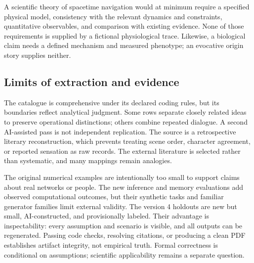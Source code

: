 A scientific theory of spacetime navigation would at minimum require a specified physical model, consistency with the relevant dynamics and constraints, quantitative observables, and comparison with existing evidence. None of those requirements is supplied by a fictional physiological trace. Likewise, a biological claim needs a defined mechanism and measured phenotype; an evocative origin story supplies neither.

\subsection{Limits of extraction and evidence}
The catalogue is comprehensive under its declared coding rules, but its boundaries reflect analytical judgment. Some rows separate closely related ideas to preserve operational distinctions; others combine repeated dialogue. A second AI-assisted pass is not independent replication. The source is a retrospective literary reconstruction, which prevents treating scene order, character agreement, or reported sensation as raw records. The external literature is selected rather than systematic, and many mappings remain analogies.

The original numerical examples are intentionally too small to support claims about real networks or people. The new inference and memory evaluations add observed computational outcomes, but their synthetic tasks and familiar generator families limit external validity. The version 4 holdouts are new but small, AI-constructed, and provisionally labeled. Their advantage is inspectability: every assumption and scenario is visible, and all outputs can be regenerated. Passing code checks, resolving citations, or producing a clean PDF establishes artifact integrity, not empirical truth. Formal correctness is conditional on assumptions; scientific applicability remains a separate question.

